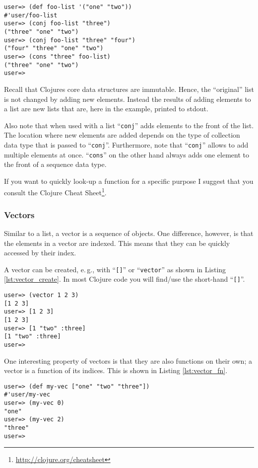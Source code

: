 \begin{lstlisting}[label=lst:list_add, caption=Add things to a list.]
user=> (def foo-list '("one" "two"))
#'user/foo-list
user=> (conj foo-list "three")
("three" "one" "two")
user=> (conj foo-list "three" "four")
("four" "three" "one" "two")
user=> (cons "three" foo-list)
("three" "one" "two")
user=> 
\end{lstlisting}

Recall that Clojures core data structures are immutable.
Hence, the ``original'' list is not changed by adding new elements.
Instead the results of adding elements to a list are new lists that are, here in the example, printed to stdout.

Also note that when used with a list ``\texttt{conj}'' adds elements to the front of the list.
The location where new elements are added depends on the type of collection data type that is passed to ``\texttt{conj}''.
Furthermore, note that ``\texttt{conj}'' allows to add multiple elements at once.
``\texttt{cons}'' on the other hand always adds one element to the front of a sequence data type.

If you want to quickly look-up a function for a specific purpose I suggest that you consult the Clojure Cheat Sheet\footnote{\url{http://clojure.org/cheatsheet}}.

\subsubsection{Vectors}
Similar to a list, a vector is a sequence of objects.
One difference, however, is that the elements in a vector are indexed.
This means that they can be quickly accessed by their index.

A vector can be created, e.\,g., with ``\texttt{[]}'' or ``\texttt{vector}'' as shown in Listing \vref{lst:vector_create}.
In most Clojure code you will find/use the short-hand ``\texttt{[]}''.

\begin{lstlisting}[label=lst:vector_create, caption=Create vectors.]
user=> (vector 1 2 3)
[1 2 3]
user=> [1 2 3]
[1 2 3]
user=> [1 "two" :three]
[1 "two" :three]
user=> 
\end{lstlisting}

One interesting property of vectors is that they are also functions on their own;
a vector is a function of its indices.
This is shown in Listing \vref{lst:vector_fn}.

\begin{lstlisting}[label=lst:vector_fn, caption=Vector as Function of its Indices]
user=> (def my-vec ["one" "two" "three"])
#'user/my-vec
user=> (my-vec 0)
"one"
user=> (my-vec 2)
"three"
user=> 
\end{lstlisting}

